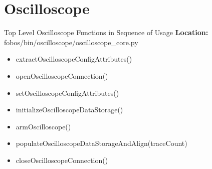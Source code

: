 \chapter{Oscilloscope}

\begin{cergbox}{Top Level Oscilloscope Functions in Sequence of Usage}
  \textbf{Location:} fobos/bin/oscilloscope/oscilloscope\_core.py
  \tcblower
  \begin{itemize}
    \item extractOscilloscopeConfigAttributes() 
    \item openOscilloscopeConnection()
    \item setOscilloscopeConfigAttributes()
    \item initializeOscilloscopeDataStorage() 
    \item armOscilloscope() 
    \item populateOscilloscopeDataStorageAndAlign(traceCount)
    \item closeOscilloscopeConnection()
  \end{itemize}
\end{cergbox}
